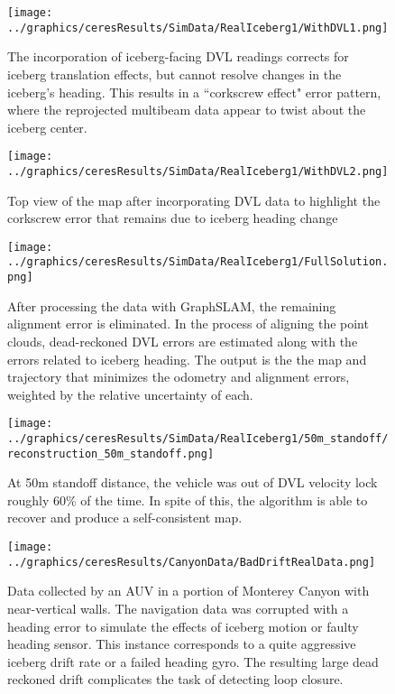  \begin{figure}[htbp]
   \centering
   \texttt{[image: ../graphics/ceresResults/SimData/RealIceberg1/WithDVL1.png]} %
   \caption{The incorporation of iceberg-facing DVL readings corrects for iceberg translation effects, but cannot resolve changes in the iceberg's heading. This results in a ``corkscrew effect" error pattern, where the reprojected multibeam data appear to twist about the iceberg center.}
   \label{fig:WithDVL1}
\end{figure}

 \begin{figure}[htbp]
   \centering
   \texttt{[image: ../graphics/ceresResults/SimData/RealIceberg1/WithDVL2.png]} %
   \caption{Top view of the map after incorporating DVL data to highlight the corkscrew error that remains due to iceberg heading change}
   \label{fig:WithDVL2}
\end{figure}

 \begin{figure}[htbp]
   \centering
   \texttt{[image: ../graphics/ceresResults/SimData/RealIceberg1/FullSolution.png]} %
   \caption{After processing the data with GraphSLAM, the remaining alignment error is eliminated. In the process of aligning the point clouds, dead-reckoned DVL errors are estimated along with the errors related to iceberg heading. The output is the the map and trajectory that minimizes the odometry and alignment errors, weighted by the relative uncertainty of each. }
   \label{fig:FullSimSol}
\end{figure}

 \begin{figure}[htbp]
   \centering
   \texttt{[image: ../graphics/ceresResults/SimData/RealIceberg1/50m\_standoff/reconstruction\_50m\_standoff.png]} %
   \caption{At 50m standoff distance, the vehicle was out of DVL velocity lock roughly 60\% of the time. In spite of this, the algorithm is able to recover and produce a self-consistent map.}
   \label{fig:FullSim50m}
\end{figure}

 \begin{figure}[htbp]
   \centering
   \texttt{[image: ../graphics/ceresResults/CanyonData/BadDriftRealData.png]} %
   \caption{Data collected by an AUV in a portion of Monterey Canyon with near-vertical walls. The navigation data was corrupted with a heading error to simulate the effects of iceberg motion or faulty heading sensor. This instance corresponds to a quite aggressive iceberg drift rate or a failed heading gyro. The resulting large dead reckoned drift complicates the task of detecting loop closure.}
   \label{fig:RealDataWithDrift}
\end{figure}

